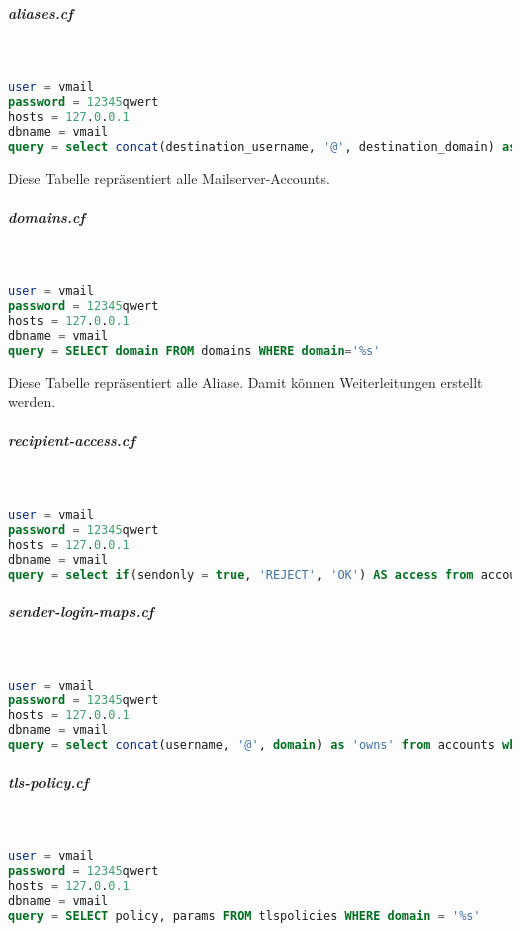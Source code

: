 \subparagraph{aliases.cf}\mbox{}\\
\begin{lstlisting}[language=SQL, caption=postfix - aliases.cf]
user = vmail
password = 12345qwert
hosts = 127.0.0.1
dbname = vmail
query = select concat(destination_username, '@', destination_domain) as destinations from aliases where source_username = '%u' and source_domain = '%d' and enabled = true;
\end{lstlisting}
Diese Tabelle repräsentiert alle Mailserver-Accounts.

\subparagraph{domains.cf}\mbox{}\\
\begin{lstlisting}[language=SQL, caption=postfix - domains.cf]
user = vmail
password = 12345qwert
hosts = 127.0.0.1
dbname = vmail
query = SELECT domain FROM domains WHERE domain='%s'
\end{lstlisting}
Diese Tabelle repräsentiert alle Aliase. Damit können Weiterleitungen erstellt werden.

\subparagraph{recipient-access.cf}\mbox{}\\
\begin{lstlisting}[language=SQL, caption=postfix - recipient-access.cf]
user = vmail
password = 12345qwert
hosts = 127.0.0.1
dbname = vmail
query = select if(sendonly = true, 'REJECT', 'OK') AS access from accounts where username = '%u' and domain = '%d' and enabled = true LIMIT 1;
\end{lstlisting}

\subparagraph{sender-login-maps.cf}\mbox{}\\
\begin{lstlisting}[language=SQL, caption=postfix - sender-login-maps.cf]
user = vmail
password = 12345qwert
hosts = 127.0.0.1
dbname = vmail
query = select concat(username, '@', domain) as 'owns' from accounts where username = '%u' AND domain = '%d' and enabled = true union select concat(destination_username, '@', destination_domain) AS 'owns' from aliases where source_username = '%u' and source_domain = '%d' and enabled = true;
\end{lstlisting}

\subparagraph{tls-policy.cf}\mbox{}\\
\begin{lstlisting}[language=SQL, caption=postfix - tls-policy.cf]
user = vmail
password = 12345qwert
hosts = 127.0.0.1
dbname = vmail
query = SELECT policy, params FROM tlspolicies WHERE domain = '%s'
\end{lstlisting}


